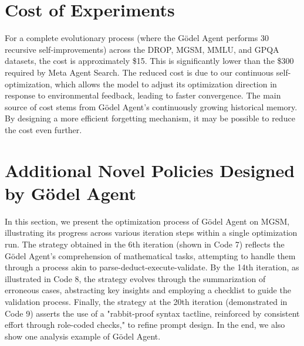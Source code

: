 \documentclass[11pt]{article}
\newcommand{\framework}{Gödel Agent\xspace}
\begin{document}
\section{Cost of Experiments}

\label{sec:cost}
For a complete evolutionary process (where the \framework performs 30 recursive self-improvements) across the DROP, MGSM, MMLU, and GPQA datasets, the cost is approximately \$15. This is significantly lower than the \$300 required by Meta Agent Search. The reduced cost is due to our continuous self-optimization, which allows the model to adjust its optimization direction in response to environmental feedback, leading to faster convergence.
The main source of cost stems from \framework's continuously growing historical memory. By designing a more efficient forgetting mechanism, it may be possible to reduce the cost even further.







\section{Additional Novel Policies Designed by \framework}

\label{sec:spacialcode}
In this section, we present the optimization process of \framework on MGSM, illustrating its progress across various iteration steps within a single optimization run. The strategy obtained in the 6th iteration (shown in Code 7) reflects the \framework's comprehension of mathematical tasks, attempting to handle them through a process akin to parse-deduct-execute-validate. By the 14th iteration, as illustrated in Code 8, the strategy evolves through the summarization of erroneous cases, abstracting key insights and employing a checklist to guide the validation process. Finally, the strategy at the 20th iteration (demonstrated in Code 9) asserts the use of a "rabbit-proof syntax tactline, reinforced by consistent effort through role-coded checks," to refine prompt design. In the end, we also show one analysis example of \framework.
\end{document}
